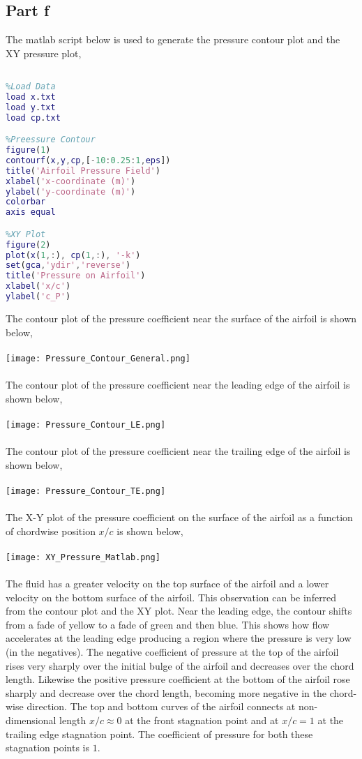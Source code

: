 \documentclass[a4paper, 12pt]{report}
\def\size{0.90}
\def\sizel{1.03}
\begin{document}
\begin{center}
\subsection{Part f}
The matlab script below is used to generate the pressure contour plot and the XY pressure plot,
\begin{lstlisting}[language=matlab]
%Author: Hans C. Suganda

%Load Data
load x.txt
load y.txt
load cp.txt

%Preessure Contour
figure(1)
contourf(x,y,cp,[-10:0.25:1,eps])
title('Airfoil Pressure Field')
xlabel('x-coordinate (m)')
ylabel('y-coordinate (m)')
colorbar
axis equal

%XY Plot
figure(2)
plot(x(1,:), cp(1,:), '-k')
set(gca,'ydir','reverse')
title('Pressure on Airfoil')
xlabel('x/c')
ylabel('c_P')
\end{lstlisting}
$$$$
The contour plot of the pressure coefficient near the surface of the airfoil is shown below,
\\~\\\texttt{[image: Pressure\_Contour\_General.png]}
\\~\\The contour plot of the pressure coefficient near the leading edge of the airfoil is shown below,
\\~\\\texttt{[image: Pressure\_Contour\_LE.png]}
\\~\\The contour plot of the pressure coefficient near the trailing edge of the airfoil is shown below,
\\~\\\texttt{[image: Pressure\_Contour\_TE.png]}
\\~\\The X-Y plot of the pressure coefficient on the surface of the airfoil as a function of chordwise position $x/c$ is shown below,
\\~\\\texttt{[image: XY\_Pressure\_Matlab.png]}
\\~\\The fluid has a greater velocity on the top surface of the airfoil and a lower velocity on the bottom surface of the airfoil. This observation can be inferred from the contour plot and the XY plot. Near the leading edge, the contour shifts from a fade of yellow to a fade of green and then blue. This shows how flow accelerates at the leading edge producing a region where the pressure is very low (in the negatives). The negative coefficient of pressure at the top of the airfoil rises very sharply over the initial bulge of the airfoil and decreases over the chord length. Likewise the positive pressure coefficient at the bottom of the airfoil rose sharply and decrease over the chord length, becoming more negative in the chord-wise direction. The top and bottom curves of the airfoil connects at non-dimensional length $x/c\approx 0$ at the front stagnation point and at $x/c=1$ at the trailing edge stagnation point. The coefficient of pressure for both these stagnation points is $1$.

\end{center}
\end{document}
